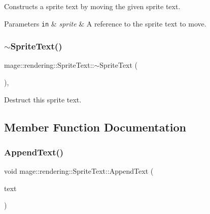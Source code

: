 Constructs a sprite text by moving the given sprite text.


\begin{DoxyParams}[1]{Parameters}
\mbox{\tt in}  & {\em sprite} & A reference to the sprite text to move. \\
\hline
\end{DoxyParams}
\hypertarget{classmage_1_1rendering_1_1_sprite_text_a6ce8013356e64827767178e01cc2737c}{}\label{classmage_1_1rendering_1_1_sprite_text_a6ce8013356e64827767178e01cc2737c} 
\subsubsection{\texorpdfstring{$\sim$\+Sprite\+Text()}{~SpriteText()}}
{\footnotesize\ttfamily mage\+::rendering\+::\+Sprite\+Text\+::$\sim$\+Sprite\+Text (\begin{DoxyParamCaption}{ }\end{DoxyParamCaption})\hspace{0.3cm}{\ttfamily [virtual]}, {\ttfamily [default]}}

Destruct this sprite text. 

\subsection{Member Function Documentation}
\hypertarget{classmage_1_1rendering_1_1_sprite_text_a3b61f48d6001d8a7adf44d946797399b}{}\label{classmage_1_1rendering_1_1_sprite_text_a3b61f48d6001d8a7adf44d946797399b} 
\subsubsection{\texorpdfstring{Append\+Text()}{AppendText()}}
{\footnotesize\ttfamily void mage\+::rendering\+::\+Sprite\+Text\+::\+Append\+Text (\begin{DoxyParamCaption}\item[{\hyperlink{classmage_1_1rendering_1_1_color_string}{Color\+String}}]{text }\end{DoxyParamCaption})}

